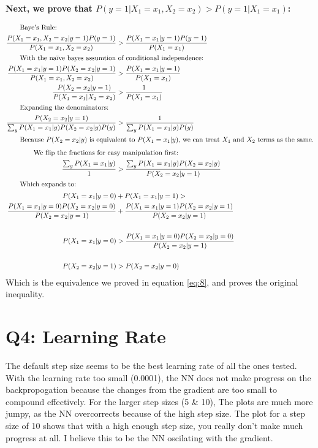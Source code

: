 \documentclass{article}
\begin{document}
        \noindent\textbf{ Next, we prove that $P(y=1|X_1=x_1, X_2=x_2) > P(y=1|X_1=x_1)$:}
        
        \begin{align}
            \intertext{\qquad Baye's Rule:}
            \frac{P(X_1=x_1, X_2=x_2|y=1)P(y=1)}{P(X_1=x_1, X_2=x_2)} 
                &> \frac{P(X_1=x_1|y=1)P(y=1)}{P(X_1=x_1)} \\
            \intertext{\qquad With the naïve bayes assumtion of conditional independence:}
            \frac{P(X_1=x_1|y=1)P(X_2=x_2|y=1)}{P(X_1=x_1, X_2=x_2)} 
                &> \frac{P(X_1=x_1|y=1)}{P(X_1=x_1)} \\
            \frac{P(X_2=x_2|y=1)}{P(X_1=x_1|X_2=x_2)}
                &> \frac{1}{P(X_1=x_1)}\\
            \intertext{\qquad Expanding the denominators:}
            \frac{P(X_2=x_2|y=1)}{\sum_y P(X_1=x_1|y)P(X_2=x_2|y)P(y)} 
                &> \frac{1}{\sum_y P(X_1=x_1|y)P(y)}\\
            \intertext{\qquad Because $P(X_2=x_2|y)$ is equivalent to $P(X_1=x_1|y)$, we can treat $X_1$ and $X_2$ terms as the same.}
            \intertext{\qquad \qquad We flip the fractions for easy manipulation first:}
            \frac{\sum_y P(X_1=x_1|y)}{1}
                &> \frac{\sum_y P(X_1=x_1|y)P(X_2=x_2|y)}{P(X_2=x_2|y=1)} \\
            \intertext{\qquad Which expands to:}
            P(X_1=x_1|y=0) &+ P(X_1=x_1|y=1)
                > \nonumber\\ 
                \frac{P(X_1=x_1|y=0)P(X_2=x_2|y=0)}{P(X_2=x_2|y=1)} &+ \frac{P(X_1=x_1|y=1)P(X_2=x_2|y=1)}{P(X_2=x_2|y=1)} \nonumber \\
            &\nonumber\\
            P(X_1=x_1|y=0) &> \frac{P(X_1=x_1|y=0)P(X_2=x_2|y=0)}{P(X_2=x_2|y=1)}\nonumber\\
            &\nonumber\\
            P(X_2=x_2|y=1) &> P(X_2=x_2|y=0)
        \end{align}
        Which is the equivalence we proved in equation \eqref{eq:8}, and proves the original inequality.

    \clearpage
    \section*{Q4: Learning Rate}
        The default step size seems to be the best learning rate of all the ones tested. 
        With the learning rate too small (0.0001), the NN does not make progress on the backpropogation because the changes from the gradient are too small to compound effectively.
        For the larger step sizes (5 \& 10), The plots are much more jumpy, as the NN overcorrects because of the high step size. 
        The plot for a step size of 10 shows that with a high enough step size, you really don't make much progress at all.
        I believe this to be the NN oscilating with the gradient.
\end{document}
